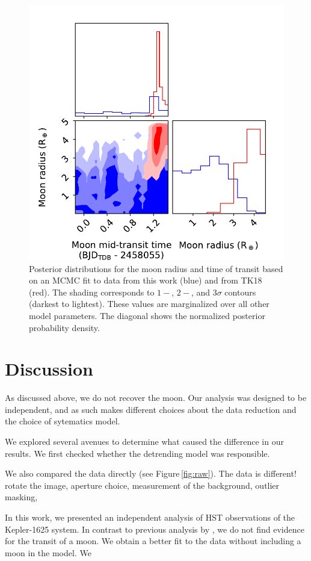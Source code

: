\documentclass[twocolumn]{aastex62}
\begin{document}
\begin{figure}
\includegraphics[width = 0.5 \textwidth]{figures/fig5_pairs.pdf}
    \caption{Posterior distributions for the moon radius and time of transit based on an MCMC fit to data from this work (blue) and from TK18 (red). The shading corresponds to $1-$, $2-$, and $3\sigma$ contours (darkest to lightest). These values are marginalized over all other model parameters. The diagonal shows the normalized posterior probability density.}
\label{fig:corner}
\end{figure}

\section{Discussion}
As discussed above, we do not recover the moon. Our analysis was designed to be independent, and as such makes different choices about the data reduction and the choice of sytematics model.

We explored several avenues to determine what caused the difference in our results. We first checked whether the detrending model was responsible. 

We also compared the data directly (see Figure\,\ref{fig:raw}). The data is different!
rotate the image, aperture choice, measurement of the background, outlier masking, 


In this work, we presented an independent analysis of HST observations of the Kepler-1625 system. In contrast to previous analysis by \citep{teachey18b}, we do not find evidence for the transit of a moon. We obtain a better fit to the data without including a moon in the model.  We 
\end{document}
